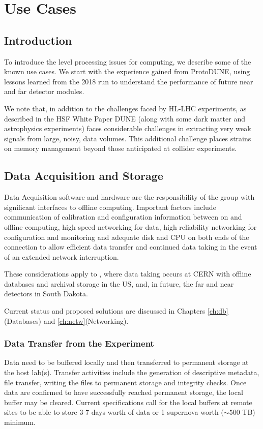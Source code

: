 \documentclass[../main-v1.tex]{subfiles}
\begin{document}
\chapter{Use Cases}
\label{ch:use}
\newcommand{\ignore}[1]{{}}



\section{Introduction}

To introduce the  level processing issues for  computing, we describe some of the known use cases.  We start with  the experience gained from  ProtoDUNE,  using lessons learned from the 2018 run to understand the performance of future near and far detector modules. 

We note that, in addition to the challenges faced by HL-LHC experiments, as described in the HSF White Paper \cite{HEPSoftwareFoundation:2017ggl} DUNE (along with some dark matter and astrophysics experiments) faces considerable challenges in extracting very weak signals from large, noisy, data volumes.  This additional challenge places strains on memory management beyond those anticipated at collider experiments. 

\section{Data Acquisition and Storage}

Data Acquisition software and hardware are the responsibility of the  group with significant interfaces to offline computing. Important factors include communication of calibration and configuration information between on and offline computing, high speed networking for data, high reliability networking for configuration and monitoring and adequate disk and CPU on both ends of the connection to allow efficient data transfer and continued data taking in the event of an extended network interruption. 

These considerations apply to , where data taking occurs at CERN with offline databases and archival storage in the US,  and, in future, the far and near detectors in South Dakota. 

Current status and proposed solutions are discussed in Chapters \ref{ch:db}(Databases) and \ref{ch:netw}(Networking). 

\subsection{Data Transfer from the Experiment}
Data need to be buffered locally and then transferred to permanent storage at the host lab(s).  Transfer activities include the generation of descriptive metadata, file transfer, writing the files to permanent storage and integrity checks.  Once data are confirmed to have successfully reached permanent storage, the local buffer may be cleared.  Current specifications call for the local buffers at remote sites to be able to store 3-7 days worth of data or 1 supernova worth ($\sim 500$ TB) minimum. 
\end{document}
